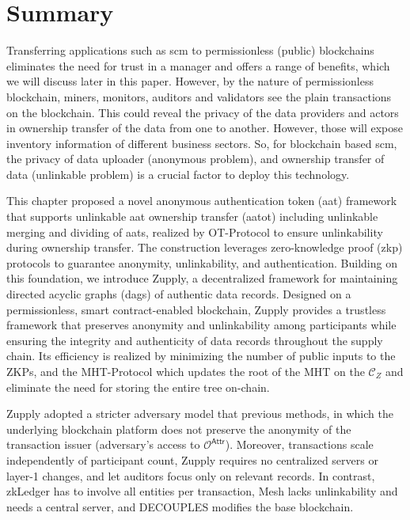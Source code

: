 \section{Summary}
\label{app:zupply-summary}


Transferring applications such as \gls{scm}  to permissionless (public) blockchains eliminates the need for trust in a manager and offers a range of benefits, which we will discuss later in this paper. However, by the nature of permissionless blockchain, miners, monitors, auditors and validators see the plain transactions on the blockchain.  This could reveal the privacy of the data providers  and actors in  ownership transfer  of the data from one to another.  However, those will expose inventory information of different business sectors.  So, for blockchain based \gls{scm}, the privacy of data uploader (anonymous problem), and ownership transfer of data (unlinkable problem) is a crucial factor to deploy this technology. 

This chapter proposed a novel anonymous authentication token (\gls{aat}) framework that supports unlinkable \gls{aat} ownership transfer (\gls{aatot}) including unlinkable merging and dividing of \gls{aat}s, realized by \textsf{OT-Protocol} to ensure unlinkability during ownership transfer. The construction leverages zero-knowledge proof (\gls{zkp}) protocols to guarantee anonymity, unlinkability, and authentication. Building on this foundation, we introduce Zupply, a decentralized framework for maintaining directed acyclic graphs (\gls{dag}s) of authentic data records. Designed on a permissionless, smart contract-enabled blockchain, Zupply provides a trustless framework that preserves anonymity and unlinkability among participants while ensuring the integrity and authenticity of data records throughout the supply chain. Its efficiency is realized by minimizing the number of public inputs to the ZKPs, and the \textsf{MHT-Protocol} which updates the root of the MHT on the $\mathcal{C}_Z$  and eliminate the need for storing the entire tree on-chain. 



Zupply adopted a stricter adversary model that previous methods, in which the underlying blockchain platform does not preserve the anonymity of the transaction issuer (adversary's access to $\mathcal{O}^\mathsf{Attr}$). Moreover, transactions scale independently of participant count, Zupply requires no centralized servers or layer-1 changes, and let auditors focus only on relevant records. In contrast, zkLedger \cite{zkLedger2018}has to involve all entities per transaction, Mesh \cite{altawy2019mesh} lacks unlinkability and needs a central server, and DECOUPLES \cite{Maouchi2019DECOUPLES} modifies the base blockchain. 